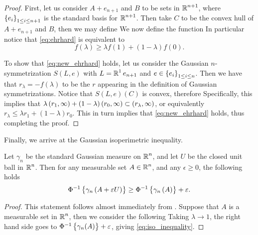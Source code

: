 \documentclass[../main.tex]{subfiles}
\begin{document}
\begin{proof}
First, let us consider $A+e_{n+1}$ and $B$ to be sets in $\operatorname{\mathbb{R}}^{n+1}$, where $\cbr{e_i}_{1\leq i\leq n+1}$ is the standard basis for $\operatorname{\mathbb{R}}^{n+1}$. Then take $C$ to be the convex hull of $A + e_{n+1}$ and $B$, then we may define  We now define the function  In particular notice that \eqref{eq:ehrhard} is equivalent to
\begin{equation}
\label{eq:new_ehrhard}
    f(\lambda)\geq\lambda f(1) + (1-\lambda)f(0).
\end{equation}

To show that \eqref{eq:new_ehrhard} holds, let us consider the Gaussian $n$-symmetrization $S(L,e)$ with $L = \operatorname{\mathbb{R}}^1e_{n+1}$ and $e\in\cbr{e_i}_{1\leq i\leq n}$. Then we have that $r_\lambda = -f(\lambda)$ to be the $r$ appearing in the definition of Gaussian symmetrizations. Notice that $S(L,e)(C)$ is convex, therefore  Specifically, this implies that $\lambda\intoo{r_1,\infty} + (1-\lambda)\intoo{r_0,\infty} \subset \intoo{r_\lambda,\infty}$, or equivalently $r_\lambda\leq \lambda r_1 + (1-\lambda)r_0$. This in turn implies that \eqref{eq:new_ehrhard} holds, thus completing the proof.
\end{proof}

Finally, we arrive at the Gaussian isoperimetric inequality.
\begin{theorem}
\label{the:gaussian_isoperimetric_inequality}
Let $\gamma_n$ be the standard Gaussian measure on $\operatorname{\mathbb{R}}^n$, and let $U$ be the closed unit ball in $\operatorname{\mathbb{R}}^n$. Then for any measurable set $A\in\operatorname{\mathbb{R}}^n$, and any $\epsilon\geq0$, the following holds
\begin{equation}
    \label{eq:iso_inequality}
    \Phi^{-1}\cbr{\gamma_n\del{A+\epsilon U}}\geq \Phi^{-1}\cbr{\gamma_n\del{A}} + \epsilon.
\end{equation}
\end{theorem}
\begin{proof}
This statement follows almost immediately from . Suppose that $A$ is a measurable set in $\operatorname{\mathbb{R}}^n$, then we consider the following  Taking $\lambda\to 1$, the right hand side goes to $\Phi^{-1}\cbr{\gamma_n(A)} + \epsilon$, giving \eqref{eq:iso_inequality}.
\end{proof}
\end{document}
